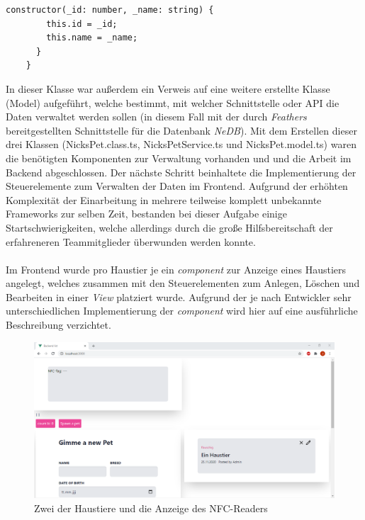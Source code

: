\documentclass[10pt, a4paper]{article}
\begin{document}
\begin{onehalfspace}
\begin{minipage}{\textwidth}
\begin{lstlisting}[caption={NicksPetService (Hello World)}, captionpos=b]
      constructor(_id: number, _name: string) {
        this.id = _id;
        this.name = _name;
      }
    }
  \end{lstlisting}
\end{minipage}
In dieser Klasse war außerdem ein Verweis auf eine weitere erstellte Klasse (Model) aufgeführt, welche bestimmt, mit welcher Schnittstelle oder API die Daten
verwaltet werden sollen (in diesem Fall mit der durch \textit{Feathers} bereitgestellten Schnittstelle für die Datenbank \textit{NeDB}).
Mit dem Erstellen dieser drei Klassen (NicksPet.class.ts, NicksPetService.ts und NicksPet.model.ts) waren die benötigten Komponenten zur Verwaltung vorhanden und
und die Arbeit im Backend abgeschlossen. Der nächste Schritt beinhaltete die Implementierung der Steuerelemente zum Verwalten der Daten im Frontend.
Aufgrund der erhöhten Komplexität der Einarbeitung in mehrere teilweise komplett unbekannte Frameworks zur selben Zeit, bestanden bei dieser Aufgabe
einige Startschwierigkeiten, welche allerdings durch die große Hilfsbereitschaft der erfahreneren Teammitglieder überwunden werden konnte.
\\~\\
Im Frontend wurde pro Haustier je ein \textit{component} zur Anzeige eines Haustiers angelegt,
welches zusammen mit den Steuerelementen zum Anlegen, Löschen und Bearbeiten in einer \textit{View} platziert wurde.
Aufgrund der je nach Entwickler sehr unterschiedlichen Implementierung der \textit{component} wird hier auf eine ausführliche Beschreibung verzichtet.

\begin{figure}[ht]
  \includegraphics[width=\textwidth]{Haustiere.png}
    \caption{Zwei der Haustiere und die Anzeige des NFC-Readers}
    \label{Haustiere}
\end{figure}


\end{onehalfspace}
\end{document}
